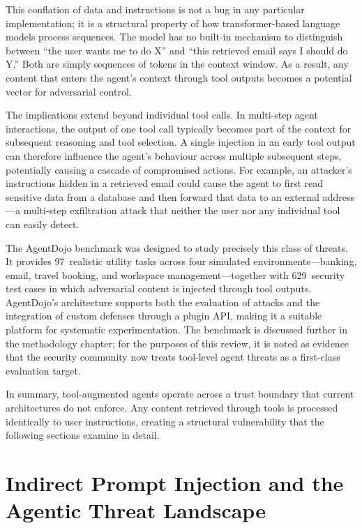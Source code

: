 This conflation of data and instructions is not a bug in any particular implementation; it is a structural property of how transformer-based language models process sequences.  The model has no built-in mechanism to distinguish between ``the user wants me to do X'' and ``this retrieved email says I should do Y.''  Both are simply sequences of tokens in the context window.  As a result, any content that enters the agent's context through tool outputs becomes a potential vector for adversarial control.

The implications extend beyond individual tool calls.  In multi-step agent interactions, the output of one tool call typically becomes part of the context for subsequent reasoning and tool selection.  A single injection in an early tool output can therefore influence the agent's behaviour across multiple subsequent steps, potentially causing a cascade of compromised actions.  For example, an attacker's instructions hidden in a retrieved email could cause the agent to first read sensitive data from a database and then forward that data to an external address---a multi-step exfiltration attack that neither the user nor any individual tool can easily detect.

The AgentDojo benchmark \parencite{debenedetti2024agentdojo} was designed to study precisely this class of threats.  It provides 97~realistic utility tasks across four simulated environments---banking, email, travel booking, and workspace management---together with 629~security test cases in which adversarial content is injected through tool outputs.  AgentDojo's architecture supports both the evaluation of attacks and the integration of custom defenses through a plugin API, making it a suitable platform for systematic experimentation.  The benchmark is discussed further in the methodology chapter; for the purposes of this review, it is noted as evidence that the security community now treats tool-level agent threats as a first-class evaluation target.

In summary, tool-augmented agents operate across a trust boundary that current architectures do not enforce.  Any content retrieved through tools is processed identically to user instructions, creating a structural vulnerability that the following sections examine in detail.


\section{Indirect Prompt Injection and the Agentic Threat Landscape}
\label{sec:ipi_threat}

